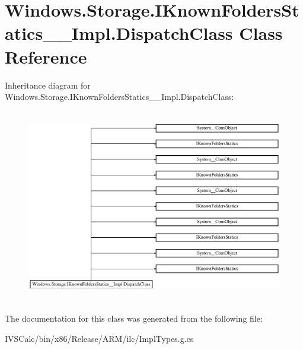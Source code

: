 \hypertarget{class_windows_1_1_storage_1_1_i_known_folders_statics_____impl_1_1_dispatch_class}{}\section{Windows.\+Storage.\+I\+Known\+Folders\+Statics\+\_\+\+\_\+\+Impl.\+Dispatch\+Class Class Reference}
\label{class_windows_1_1_storage_1_1_i_known_folders_statics_____impl_1_1_dispatch_class}
Inheritance diagram for Windows.\+Storage.\+I\+Known\+Folders\+Statics\+\_\+\+\_\+\+Impl.\+Dispatch\+Class\+:\begin{figure}[H]
\begin{center}
\leavevmode
\includegraphics[height=8.484849cm]{class_windows_1_1_storage_1_1_i_known_folders_statics_____impl_1_1_dispatch_class}
\end{center}
\end{figure}


The documentation for this class was generated from the following file\+:\begin{DoxyCompactItemize}
\item 
I\+V\+S\+Calc/bin/x86/\+Release/\+A\+R\+M/ilc/Impl\+Types.\+g.\+cs\end{DoxyCompactItemize}
